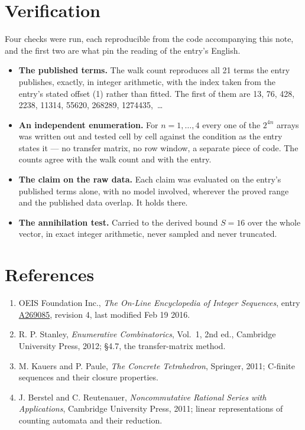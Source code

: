 \documentclass[11pt]{article}
\theoremstyle{definition}
\begin{document}
\section{Verification}

Four checks were run, each reproducible from the code accompanying this note, and the first two are what pin the reading of the entry's English.

\begin{itemize}

\item {\bfseries The published terms.} The walk count reproduces all 21 terms the entry publishes, exactly, in integer arithmetic, with the index taken from the entry's stated offset (1) rather than fitted. The first of them are 13, 76, 428, 2238, 11314, 55620, 268289, 1274435,~\dots

\item {\bfseries An independent enumeration.} For $n = 1,\dots,4$ every one of the $2^{4n}$ arrays was written out and tested cell by cell against the condition as the entry states it --- no transfer matrix, no row window, a separate piece of code. The counts agree with the walk count and with the entry.

\item {\bfseries The claim on the raw data.} Each claim was evaluated on the entry's published terms alone, with no model involved, wherever the proved range and the published data overlap. It holds there.

\item {\bfseries The annihilation test.} Carried to the derived bound $S = 16$ over the whole vector, in exact integer arithmetic, never sampled and never truncated.

\end{itemize}

\section{References}

\begin{enumerate}

\item OEIS Foundation Inc., \emph{The On-Line Encyclopedia of Integer Sequences}, entry \href{https://oeis.org/A269085}{A269085}, revision 4, last modified Feb 19 2016.

\item R. P. Stanley, \emph{Enumerative Combinatorics}, Vol.~1, 2nd ed., Cambridge University Press, 2012; \S4.7, the transfer-matrix method.

\item M. Kauers and P. Paule, \emph{The Concrete Tetrahedron}, Springer, 2011; C-finite sequences and their closure properties.

\item J. Berstel and C. Reutenauer, \emph{Noncommutative Rational Series with Applications}, Cambridge University Press, 2011; linear representations of counting automata and their reduction.

\end{enumerate}
\end{document}
